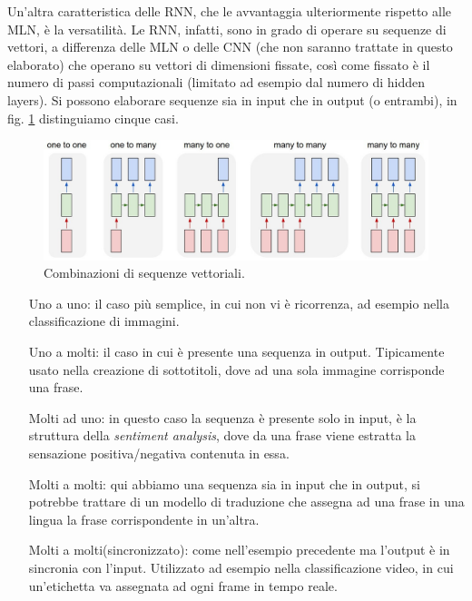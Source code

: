Un'altra caratteristica delle RNN, che le avvantaggia ulteriormente rispetto alle MLN, è la versatilità. Le RNN, infatti, sono in grado di operare su sequenze di vettori, a differenza delle MLN o delle CNN (che non saranno trattate in questo elaborato) che operano su vettori di dimensioni fissate, così come fissato è il numero di passi computazionali (limitato ad esempio dal numero di hidden layers). Si possono elaborare sequenze sia in input che in output (o entrambi), in fig. \ref{fig:1.7} distinguiamo cinque casi.
\newpage
\begin{figure}[h]
	\centering
	\includegraphics{img/rnn_seq.jpg}
	\caption{Combinazioni di sequenze vettoriali. \cite{rnn_effect}}
	\label{fig:1.7}
\end{figure}

\begin{enumerate}
	\item[Uno a uno:] il caso più semplice, in cui non vi è ricorrenza, ad esempio nella classificazione di immagini.
	\item[Uno a molti:] il caso in cui è presente una sequenza in output. Tipicamente usato nella creazione di sottotitoli, dove ad una sola immagine corrisponde una frase.
	\item[Molti ad uno:] in questo caso la sequenza è presente solo in input, è la struttura della \textit{sentiment analysis}, dove da una frase viene estratta la sensazione positiva/negativa contenuta in essa.
	\item[Molti a molti:] qui abbiamo una sequenza sia in input che in output, si potrebbe trattare di un modello di traduzione che assegna ad una frase in una lingua la frase corrispondente in un'altra.
	\item[Molti a molti(sincronizzato):] come nell'esempio precedente ma l'output è in sincronia con l'input. Utilizzato ad esempio nella classificazione video, in cui un'etichetta va assegnata ad ogni frame in tempo reale.
\end{enumerate}
